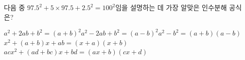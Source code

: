 다음 중 $97.5^2+5\times97.5+2.5^2=100^2$임을 설명하는 데 가장 알맞은 인수분해 공식은? 
\begin{choicesv}{$a^2+2ab+b^2=(a+b)^2$}{$a^2-2ab+b^2=(a-b)^2$}{$a^2-b^2=(a+b)(a-b)$}{$x^2+(a+b)x+ab=(x+a)(x+b)$}{$acx^2+(ad+bc)x+bd=(ax+b)(cx+d)$}\end{choicesv}
